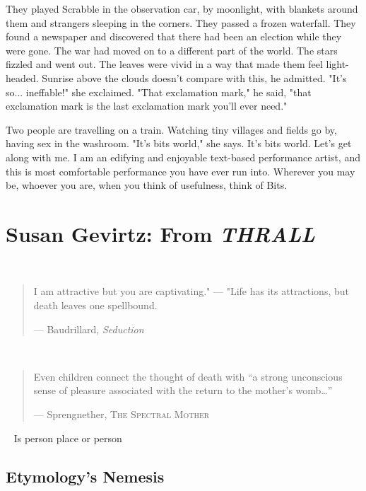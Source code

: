 \documentclass[
]{memoir}
\begin{document}
They played Scrabble in the observation car, by moonlight, with blankets
around them and strangers sleeping in the corners. They passed a frozen
waterfall. They found a newspaper and discovered that there had been an
election while they were gone. The war had moved on to a different part
of the world. The stars fizzled and went out. The leaves were vivid in a
way that made them feel light-headed. Sunrise above the clouds doesn't
compare with this, he admitted. "It's so... ineffable!" she exclaimed.
"That exclamation mark," he said, "that exclamation mark is the last
exclamation mark you'll ever need."

Two people are travelling on a train. Watching tiny villages and fields
go by, having sex in the washroom. "It's bits world," she says. It's
bits world. Let's get along with me. I am an edifying and enjoyable
text-based performance artist, and this is most comfortable performance
you have ever run into. Wherever you may be, whoever you are, when you
think of usefulness, think of Bits.

\hypertarget{susan-gevirtz-from-thrall}{%
\chapter{\texorpdfstring{Susan Gevirtz: From
\emph{THRALL}}{Susan Gevirtz: From THRALL}}\label{susan-gevirtz-from-thrall}}

~

\begin{quote}
I am attractive but you are captivating." --- "Life has its attractions,
but death leaves one spellbound.

--- Baudrillard, \emph{Seduction}
\end{quote}

~

\begin{quote}
Even children connect the thought of death with ``a strong unconscious
sense of pleasure associated with the return to the mother's
womb\ldots{}''

--- Sprengnether, \textsc{The Spectral Mother}
\end{quote}

~ Is person place or person

\hypertarget{etymologys-nemesis}{%
\section*{Etymology's Nemesis}\label{etymologys-nemesis}}
\end{document}
